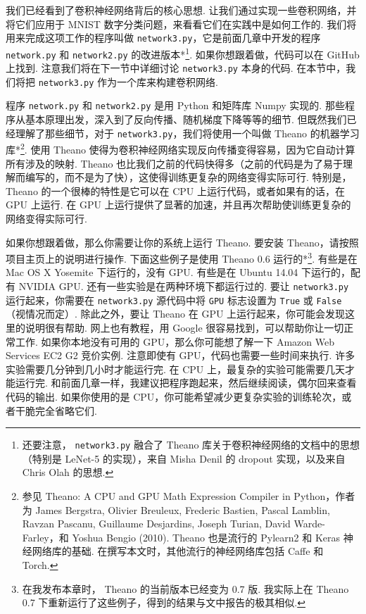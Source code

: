 我们已经看到了卷积神经网络背后的核心思想. 让我们通过实现一些卷积网络，并将它们应用于 MNIST 数字分类问题，来看看它们在实践中是如何工作的. 我们将用来完成这项工作的程序叫做 \texttt{network3.py}，它是前面几章中开发的程序 \texttt{network.py} 和 \texttt{network2.py} 的改进版本*\footnote{还要注意， \texttt{network3.py} 融合了 Theano 库关于卷积神经网络的文档中的思想（特别是 LeNet-5 的实现），来自 Misha Denil 的 dropout 实现，以及来自 Chris Olah 的思想.}. 如果你想跟着做，代码可以在 GitHub 上找到. 注意我们将在下一节中详细讨论 \texttt{network3.py} 本身的代码. 在本节中，我们将把 \texttt{network3.py} 作为一个库来构建卷积网络.

程序 \texttt{network.py} 和 \texttt{network2.py} 是用 Python 和矩阵库 Numpy 实现的. 那些程序从基本原理出发，深入到了反向传播、随机梯度下降等等的细节. 但既然我们已经理解了那些细节，对于 \texttt{network3.py}，我们将使用一个叫做 Theano 的机器学习库*\footnote{参见 Theano: A CPU and GPU Math Expression Compiler in Python，作者为 James Bergstra, Olivier Breuleux, Frederic Bastien, Pascal Lamblin, Ravzan Pascanu, Guillaume Desjardins, Joseph Turian, David Warde-Farley，和 Yoshua Bengio (2010). Theano 也是流行的 Pylearn2 和 Keras 神经网络库的基础. 在撰写本文时，其他流行的神经网络库包括 Caffe 和 Torch.}. 使用 Theano 使得为卷积神经网络实现反向传播变得容易，因为它自动计算所有涉及的映射. Theano 也比我们之前的代码快得多（之前的代码是为了易于理解而编写的，而不是为了快），这使得训练更复杂的网络变得实际可行. 特别是， Theano 的一个很棒的特性是它可以在 CPU 上运行代码，或者如果有的话，在 GPU 上运行. 在 GPU 上运行提供了显著的加速，并且再次帮助使训练更复杂的网络变得实际可行.

如果你想跟着做，那么你需要让你的系统上运行 Theano. 要安装 Theano，请按照项目主页上的说明进行操作. 下面这些例子是使用 Theano 0.6 运行的*\footnote{在我发布本章时， Theano 的当前版本已经变为 0.7 版. 我实际上在 Theano 0.7 下重新运行了这些例子，得到的结果与文中报告的极其相似.}. 有些是在 Mac OS X Yosemite 下运行的，没有 GPU. 有些是在 Ubuntu 14.04 下运行的，配有 NVIDIA GPU. 还有一些实验是在两种环境下都运行过的. 要让 \texttt{network3.py} 运行起来，你需要在 \texttt{network3.py} 源代码中将 \texttt{GPU} 标志设置为 \texttt{True} 或 \texttt{False}（视情况而定）. 除此之外，要让 Theano 在 GPU 上运行起来，你可能会发现这里的说明很有帮助. 网上也有教程，用 Google 很容易找到，可以帮助你让一切正常工作. 如果你本地没有可用的 GPU，那么你可能想了解一下 Amazon Web Services EC2 G2 竞价实例. 注意即使有 GPU，代码也需要一些时间来执行. 许多实验需要几分钟到几小时才能运行完. 在 CPU 上，最复杂的实验可能需要几天才能运行完. 和前面几章一样，我建议把程序跑起来，然后继续阅读，偶尔回来查看代码的输出. 如果你使用的是 CPU，你可能希望减少更复杂实验的训练轮次，或者干脆完全省略它们.

